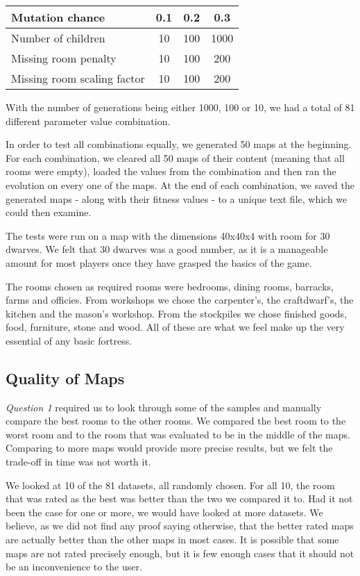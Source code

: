 \begin{center}
	\begin{tabular}{| l | c | c | c | }
		\hline
	  	Mutation chance 			& 0.1 & 0.2 & 0.3 \\ \hline
	  	Number of children  		& 10 & 100 & 1000 \\ \hline
	 	Missing room penalty 		& 10 & 100 & 200 \\ \hline
	  	Missing room scaling factor 	& 10 & 100 & 200 \\ \hline
	\end{tabular}
\end{center}

With the number of generations being either 1000, 100 or 10, we had a total of 81 different parameter value combination. 

In order to test all combinations equally, we generated 50 maps at the beginning. For each combination, we cleared all 50 maps of their content (meaning that all rooms were empty), loaded the values from the combination and then ran the evolution on every one of the maps. At the end of each combination, we saved the generated maps - along with their fitness values - to a unique text file, which we could then examine.

The tests were run on a map with the dimensions 40x40x4 with room for 30 dwarves. We felt that 30 dwarves was a good number, as it is a manageable amount for most players once they have grasped the basics of the game.

The rooms chosen as required rooms were bedrooms, dining rooms, barracks, farms and officies. From workshops we chose the carpenter's, the craftdwarf's, the kitchen and the mason's workshop. From the stockpiles we chose finished goods, food, furniture, stone and wood. All of these are what we feel make up the very essential of any basic fortress.

\subsection{Quality of Maps}

\textit{Question 1} required us to look through some of the samples and manually compare the best rooms to the other rooms. We compared the best room to the worst room and to the room that was evaluated to be in the middle of the maps. Comparing to more maps would provide more precise results, but we felt the trade-off in time was not worth it.

We looked at 10 of the 81 datasets, all randomly chosen. For all 10, the room that was rated as the best was better than the two we compared it to. Had it not been the case for one or more, we would have looked at more datasets. We believe, as we did not find any proof saying otherwise, that the better rated maps are actually better than the other maps in most cases. It is possible that some maps are not rated precisely enough, but it is few enough cases that it should not be an inconvenience to the user.

